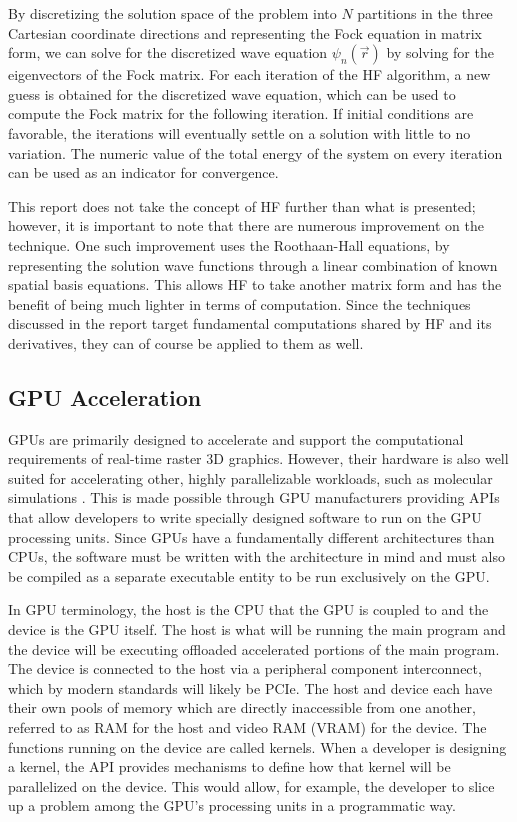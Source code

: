 \documentclass[conference, twoside]{IEEEtran}
\begin{document}
By discretizing the solution space of the problem into $N$ partitions in the three Cartesian coordinate directions and representing the Fock equation in matrix form, we can solve for the discretized wave equation $\psi_n(\vec{r})$ by solving for the eigenvectors of the Fock matrix. For each iteration of the HF algorithm, a new guess is obtained for the discretized wave equation, which can be used to compute the Fock matrix for the following iteration. If initial conditions are favorable, the iterations will eventually settle on a solution with little to no variation. The numeric value of the total energy of the system on every iteration can be used as an indicator for convergence.

This report does not take the concept of HF further than what is presented; however, it is important to note that there are numerous improvement on the technique. One such improvement uses the Roothaan-Hall equations, by representing the solution wave functions through a linear combination of known spatial basis equations. This allows HF to take another matrix form and has the benefit of being much lighter in terms of computation. Since the techniques discussed in the report target fundamental computations shared by HF and its derivatives, they can of course be applied to them as well.

\subsection{GPU Acceleration} %

GPUs are primarily designed to accelerate and support the computational requirements of real-time raster 3D graphics. However, their hardware is also well suited for accelerating other, highly parallelizable workloads, such as molecular simulations \cite{electronic-structure-calculations-on-gpus}. This is made possible through GPU manufacturers providing APIs that allow developers to write specially designed software to run on the GPU processing units. Since GPUs have a fundamentally different architectures than CPUs, the software must be written with the architecture in mind and must also be compiled as a separate executable entity to be run exclusively on the GPU.

In GPU terminology, the host is the CPU that the GPU is coupled to and the device is the GPU itself. The host is what will be running the main program and the device will be executing offloaded accelerated portions of the main program. The device is connected to the host via a peripheral component interconnect, which by modern standards will likely be PCIe. The host and device each have their own pools of memory which are directly inaccessible from one another, referred to as RAM for the host and video RAM (VRAM) for the device. The functions running on the device are called kernels. When a developer is designing a kernel, the API provides mechanisms to define how that kernel will be parallelized on the device. This would allow, for example, the developer to slice up a problem among the GPU's processing units in a programmatic way.
\end{document}
